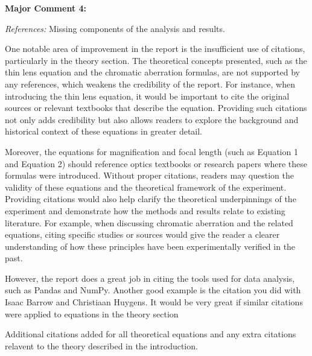\documentclass[%
 aip,
cp,  %
 amsmath,amssymb,
 reprint,%
]{revtex4-2}
\begin{document}
        \begin{mdframed} \textbf{Major Comment 4:}

            \textit{References:} Missing components of the analysis and results.


            One notable area of improvement in the report is the insufficient use of citations, particularly in the theory section. The theoretical concepts presented, such as the thin lens equation and the chromatic aberration formulas, are not supported by any references, which weakens the credibility of the report. For instance, when introducing the thin lens equation, it would be important to cite the original sources or relevant textbooks that describe the equation. Providing such citations not only adds credibility but also allows readers to explore the background and historical context of these equations in greater detail.

            Moreover, the equations for magnification and focal length (such as Equation 1 and Equation 2) should reference optics textbooks or research papers where these formulas were introduced. Without proper citations, readers may question the validity of these equations and the theoretical framework of the experiment. Providing citations would also help clarify the theoretical underpinnings of the experiment and demonstrate how the methods and results relate to existing literature. For example, when discussing chromatic aberration and the related equations, citing specific studies or sources would give the reader a clearer understanding of how these principles have been experimentally verified in the past. 

            However, the report does a great job in citing the tools used for data analysis, such as Pandas and NumPy. Another good example is the citation you did with Isaac Barrow and Christiaan Huygens. It would be very great if similar citations were applied to equations in the theory section
        \end{mdframed}
        {\color{red}
        
            Additional citations added for all theoretical equations and any extra citations relavent to the theory described in the introduction.

        }
\end{document}
